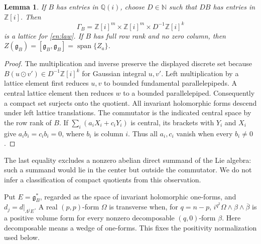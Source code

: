 \documentclass[12pt]{amsart}
\newcommand{\lemword}{Lemma}
\newtheorem{lem}[thm]{\lemword}
\theoremstyle{definition}
\theoremstyle{remark}
\numberwithin{equation}{section}
\newcommand{\Z}{\mathbb{Z}}
\newcommand{\N}{\mathbb{N}}
\newcommand{\Q}{\mathbb{Q}}
\begin{document}
\begin{lem}\label{en:lattice}
If $B$ has entries in $\Q(i)$, choose $D\in\N$ such that
$DB$ has entries in $\Z[i]$. Then
\[
 \Gamma_B=\Z[i]^m\times\Z[i]^m\times D^{-1}\Z[i]^k
\]
is a lattice for \eqref{en:law}. If $B$ has full row rank and no zero column,
then $Z(\mathfrak g_B)=[\mathfrak g_B,\mathfrak g_B]
=\operatorname{span}\{Z_a\}$.
\end{lem}
\begin{proof}
The multiplication and inverse preserve the displayed discrete set because
$B(u\odot v')\in D^{-1}\Z[i]^k$ for Gaussian integral $u,v'$.
Left multiplication by a lattice element first reduces $u,v$ to bounded
fundamental parallelepipeds. A central lattice element then reduces $w$ to a
bounded parallelepiped. Consequently a compact set surjects onto the quotient.
All invariant holomorphic forms descend under left lattice translations.
The commutator is the indicated central space by the row rank of $B$.
If $\sum_i(a_iX_i+c_iY_i)$ is central, its brackets with $Y_i$ and $X_i$
give $a_i b_i=c_i b_i=0$, where $b_i$ is column $i$. Thus all $a_i,c_i$ vanish
when every $b_i\ne0$.
\end{proof}

The last equality excludes a nonzero abelian direct summand of the Lie
algebra: such a summand would lie in the center but outside the commutator.
We do not infer a classification of compact quotients from this observation.

Put $E=\mathfrak g_B^*$, regarded as the space of invariant holomorphic
one-forms, and $d_j=d|_{\Lambda^j E}$.
A real $(p,p)$-form $\Omega$ is transverse when, for $q=n-p$,
$i^{q^2}\Omega\wedge\beta\wedge\overline\beta$ is a positive volume form
for every nonzero decomposable $(q,0)$-form $\beta$.
Here decomposable means a wedge of one-forms. This fixes the positivity
normalization used below.
\end{document}
